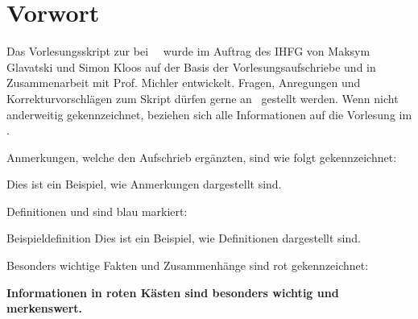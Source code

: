 \thispagestyle{vorwort}
\section*{Vorwort}
Das Vorlesungsskript zur \emph{\LectureTitle} bei \LecturerTitle~\LecturerName~wurde im Auftrag des IHFG von Maksym Glavatski und Simon Kloos auf der Basis der Vorlesungsaufschriebe und in Zusammenarbeit mit Prof. Michler entwickelt. Fragen, Anregungen und Korrekturvorschlägen zum Skript dürfen gerne an \ContactEmail~gestellt werden. Wenn nicht anderweitig gekennzeichnet, beziehen sich alle Informationen auf die Vorlesung im \LectureSemester.\par

Anmerkungen, welche den Aufschrieb ergänzten, sind wie folgt gekennzeichnet:
\begin{verbal}
    Dies ist ein Beispiel, wie Anmerkungen dargestellt sind.
\end{verbal}

Definitionen und  sind blau markiert:
\begin{definition}{Beispieldefinition}
    Dies ist ein Beispiel, wie Definitionen dargestellt sind.
\end{definition}

Besonders wichtige Fakten und Zusammenhänge sind rot gekennzeichnet:
\begin{important}
    \textbf{Informationen in roten Kästen sind besonders wichtig und merkenswert.}
\end{important}